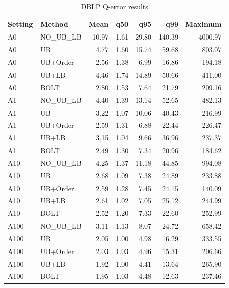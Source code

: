 \begin{table}[H]
\centering
\small
\setlength{\tabcolsep}{5pt}
\caption{DBLP Q-error results}
\label{tab:A_accuracy_DBLP}
\begin{tabular}{@{}llrrrrr@{}}
\toprule
Setting & Method & Mean & q50 & q95 & q99 & Maximum \\
\midrule
A0 & NO\_UB_LB & 10.97 & 1.61 & 29.80 & 140.39 & 4000.97 \\
A0 & UB & 4.77 & 1.60 & 15.74 & 59.68 & 803.07 \\
A0 & UB+Order & 2.56 & 1.38 & 6.99 & 16.86 & 194.18 \\
A0 & UB+LB & 4.46 & 1.74 & 14.89 & 50.66 & 411.00 \\
A0 & BOLT & 2.80 & 1.53 & 7.64 & 21.79 & 209.16 \\
A1 & NO\_UB_LB & 4.40 & 1.39 & 13.14 & 52.65 & 482.13 \\
A1 & UB & 3.22 & 1.07 & 10.06 & 40.43 & 216.99 \\
A1 & UB+Order & 2.59 & 1.31 & 6.88 & 22.44 & 226.47 \\
A1 & UB+LB & 3.15 & 1.04 & 9.66 & 36.96 & 237.37 \\
A1 & BOLT & 2.49 & 1.30 & 7.34 & 20.96 & 184.62 \\
A10 & NO\_UB_LB & 4.25 & 1.37 & 11.18 & 44.85 & 994.08 \\
A10 & UB & 2.68 & 1.09 & 7.38 & 24.89 & 233.88 \\
A10 & UB+Order & 2.59 & 1.28 & 7.45 & 24.15 & 140.09 \\
A10 & UB+LB & 2.61 & 1.02 & 7.05 & 25.12 & 244.99 \\
A10 & BOLT & 2.52 & 1.20 & 7.33 & 22.60 & 252.99 \\
A100 & NO\_UB_LB & 3.11 & 1.13 & 8.07 & 24.72 & 658.42 \\
A100 & UB & 2.05 & 1.00 & 4.98 & 16.29 & 333.55 \\
A100 & UB+Order & 2.03 & 1.03 & 4.96 & 15.31 & 206.66 \\
A100 & UB+LB & 1.92 & 1.00 & 4.41 & 13.64 & 265.90 \\
A100 & BOLT & 1.95 & 1.03 & 4.48 & 12.63 & 237.46 \\
\bottomrule
\end{tabular}
\end{table}
